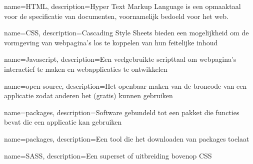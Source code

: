 

\makeglossaries

{
    name=HTML,
    description={Hyper Text Markup Language is een opmaaktaal voor de specificatie van documenten, voornamelijk bedoeld voor het web.}
}

{
    name=CSS,
    description={Cascading Style Sheets bieden een mogelijkheid om de vormgeving van webpagina's los te koppelen van hun feitelijke inhoud}
}

{
    name=Javascript,
    description={Een veelgebruikte scripttaal om webpagina's interactief te maken en webapplicaties te ontwikkelen}
}

{
    name=open-source,
    description={Het openbaar maken van de broncode van een applicatie zodat anderen het (gratis) kunnen gebruiken}
}

{
    name=packages,
    description={Software gebundeld tot een pakket die functies bevat die een applicatie kan gebruiken}
}

{
    name=packages,
    description={Een tool die het downloaden van packages toelaat}
}

{
    name=SASS,
    description={Een superset of uitbreiding bovenop CSS}
}
